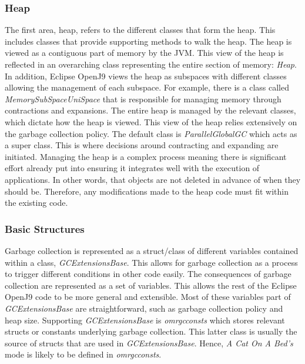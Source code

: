 \subsubsection{Heap}
The first area, heap, refers to the different classes that form the heap. This includes classes that provide supporting methods to walk the heap. The heap is viewed as a contiguous part of memory by the JVM. This view of the heap is reflected in an overarching class representing the entire section of memory:  \emph{Heap}. In addition, Eclipse OpenJ9 views the heap as subspaces with different classes allowing the management of each subspace. For example, there is a class called \emph{MemorySubSpaceUniSpace} that is responsible for managing memory through contractions and expansions. The entire heap is managed by the relevant classes, which dictate how the heap is viewed. This view of the heap relies extensively on the garbage collection policy. The default class is \emph{ParallelGlobalGC} which acts as a super class. This is where decisions around contracting and expanding are initiated.  
\newline\newline
Managing the heap is a complex process meaning there is significant effort already put into ensuring it integrates well with the execution of applications. In other words, that objects are not deleted in advance of when they should be. Therefore, any modifications made to the heap code must fit within the existing code. 

\subsubsection{Basic Structures}

Garbage collection is represented as a struct/class of different variables contained within a class, \emph{GCExtensionsBase}. This allows for garbage collection as a process to trigger different conditions in other code easily. The consequences of garbage collection are represented as a set of variables. This allows the rest of the Eclipse OpenJ9 code to be more general and extensible. Most of these variables part of \emph{GCExtensionsBase} are straightforward, such as garbage collection policy and heap size. Supporting \emph{GCExtensionsBase} is \emph{omrgcconsts} which stores relevant structs or constants underlying garbage collection. This latter class is usually the source of structs that are used in \emph{GCExtensionsBase}. Hence, \emph{A Cat On A Bed’s} mode is likely to be defined in \emph{omrgcconsts}. 

